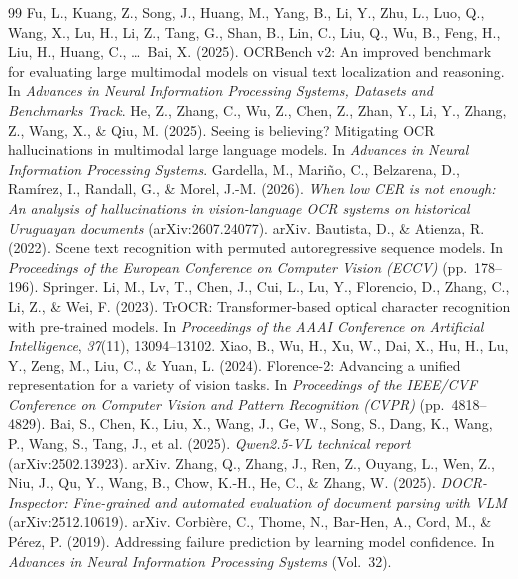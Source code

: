 \begingroup\footnotesize\setlength{\parskip}{0pt}
\renewcommand{\refname}{\fontsize{12}{12}\selectfont\textbf{References}}
\begin{thebibliography}{99}\setlength{\itemsep}{1pt}
 Fu, L., Kuang, Z., Song, J., Huang, M., Yang, B., Li, Y., Zhu, L., Luo, Q., Wang, X., Lu, H., Li, Z., Tang, G., Shan, B., Lin, C., Liu, Q., Wu, B., Feng, H., Liu, H., Huang, C., \ldots\ Bai, X. (2025). OCRBench v2: An improved benchmark for evaluating large multimodal models on visual text localization and reasoning. In \textit{Advances in Neural Information Processing Systems, Datasets and Benchmarks Track}.
 He, Z., Zhang, C., Wu, Z., Chen, Z., Zhan, Y., Li, Y., Zhang, Z., Wang, X., \& Qiu, M. (2025). Seeing is believing? Mitigating OCR hallucinations in multimodal large language models. In \textit{Advances in Neural Information Processing Systems}.
 Gardella, M., Mari\~no, C., Belzarena, D., Ram\'irez, I., Randall, G., \& Morel, J.-M. (2026). \textit{When low CER is not enough: An analysis of hallucinations in vision-language OCR systems on historical Uruguayan documents} (arXiv:2607.24077). arXiv.
 Bautista, D., \& Atienza, R. (2022). Scene text recognition with permuted autoregressive sequence models. In \textit{Proceedings of the European Conference on Computer Vision (ECCV)} (pp.~178--196). Springer.
 Li, M., Lv, T., Chen, J., Cui, L., Lu, Y., Florencio, D., Zhang, C., Li, Z., \& Wei, F. (2023). TrOCR: Transformer-based optical character recognition with pre-trained models. In \textit{Proceedings of the AAAI Conference on Artificial Intelligence}, \textit{37}(11), 13094--13102.
 Xiao, B., Wu, H., Xu, W., Dai, X., Hu, H., Lu, Y., Zeng, M., Liu, C., \& Yuan, L. (2024). Florence-2: Advancing a unified representation for a variety of vision tasks. In \textit{Proceedings of the IEEE/CVF Conference on Computer Vision and Pattern Recognition (CVPR)} (pp.~4818--4829).
 Bai, S., Chen, K., Liu, X., Wang, J., Ge, W., Song, S., Dang, K., Wang, P., Wang, S., Tang, J., et al. (2025). \textit{Qwen2.5-VL technical report} (arXiv:2502.13923). arXiv.
 Zhang, Q., Zhang, J., Ren, Z., Ouyang, L., Wen, Z., Niu, J., Qu, Y., Wang, B., Chow, K.-H., He, C., \& Zhang, W. (2025). \textit{DOCR-Inspector: Fine-grained and automated evaluation of document parsing with VLM} (arXiv:2512.10619). arXiv.
 Corbi\`ere, C., Thome, N., Bar-Hen, A., Cord, M., \& P\'erez, P. (2019). Addressing failure prediction by learning model confidence. In \textit{Advances in Neural Information Processing Systems} (Vol.~32).

\end{thebibliography}
